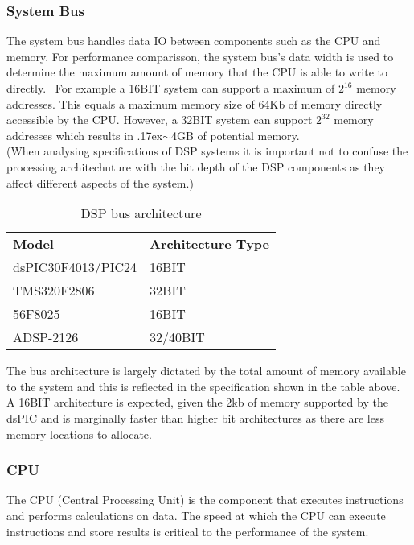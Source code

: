 \documentclass[titlepage]{scrartcl}
\begin{document}
    \subsubsection{System Bus}
    The system bus handles data IO between components such as the CPU
    and memory. For performance comparisson, the system bus's data width is
    used to determine the maximum amount of memory that the CPU is able to
    write to directly.~\parencite[p.318]{raf2014fdlm}
    For example a 16BIT system can support a maximum of $2^{16}$ memory
    addresses. This equals a maximum memory size of 64Kb of memory directly
    accessible by the CPU. However, a 32BIT system can support $2^{32}$ memory
    addresses which results in
    {\raise.17ex\hbox{$\scriptstyle\mathtt{\sim}$}}4GB of potential
    memory.~\parencite[p.34]{sd2006mfes}\\
    (When analysing specifications of DSP systems it is important not to
    confuse the processing architechuture with the bit depth of the DSP
    components as they affect different aspects of the system.)

    \begin{table}[H]
    \centering
    \caption{DSP bus architecture}
    \label{my-label}
    \begin{tabular}{ll}
        \textbf{Model}     & \textbf{Architecture Type}\\
        dsPIC30F4013/PIC24 & 16BIT      \\
        TMS320F2806        & 32BIT     \\
        56F8025            & 16BIT      \\
        ADSP-2126          & 32/40BIT
    \end{tabular}
    \end{table}

    The bus architecture is largely dictated by the total amount of memory
    available to the system and this is reflected in the specification shown in
    the table above. A 16BIT architecture is expected, given the 2kb of memory
    supported by the dsPIC and is marginally faster than higher bit
    architectures as there are less memory locations to allocate. 

    \subsubsection{CPU}\label{CPU}
    The CPU (Central Processing Unit) is the component that executes
    instructions and performs calculations on data. The speed at which the CPU
    can execute instructions and store results is critical to the performance
    of the system.
\end{document}
